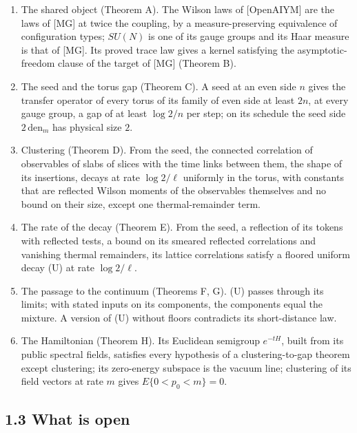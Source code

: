 \documentclass[10pt,letterpaper,twocolumn]{article}
\providecommand{\tightlist}{\setlength{\itemsep}{0pt}\setlength{\parskip}{0pt}}
\begin{document}
\begin{enumerate}
\def\labelenumi{\arabic{enumi}.}
\tightlist
\item
  The shared object (Theorem A). The Wilson laws of {[}OpenAIYM{]} are the laws of {[}MG{]} at twice the coupling, by a measure-preserving equivalence of configuration types; \(SU(N)\) is one of its gauge groups and its Haar measure is that of {[}MG{]}. Its proved trace law gives a kernel satisfying the asymptotic-freedom clause of the target of {[}MG{]} (Theorem B).
\item
  The seed and the torus gap (Theorem C). A seed at an even side \(n\) gives the transfer operator of every torus of its family of even side at least \(2n\), at every gauge group, a gap of at least \(\log2/n\) per step; on its schedule the seed side \(2\,\mathrm{den}_m\) has physical size \(2\).
\item
  Clustering (Theorem D). From the seed, the connected correlation of observables of slabs of slices with the time links between them, the shape of its insertions, decays at rate \(\log2/\ell\) uniformly in the torus, with constants that are reflected Wilson moments of the observables themselves and no bound on their size, except one thermal-remainder term.
\item
  The rate of the decay (Theorem E). From the seed, a reflection of its tokens with reflected tests, a bound on its smeared reflected correlations and vanishing thermal remainders, its lattice correlations satisfy a floored uniform decay (U) at rate \(\log2/\ell\).
\item
  The passage to the continuum (Theorems F, G). (U) passes through its limits; with stated inputs on its components, the components equal the mixture. A version of (U) without floors contradicts its short-distance law.
\item
  The Hamiltonian (Theorem H). Its Euclidean semigroup \(e^{-tH}\), built from its public spectral fields, satisfies every hypothesis of a clustering-to-gap theorem except clustering; its zero-energy subspace is the vacuum line; clustering of its field vectors at rate \(m\) gives \(E\{0<p_0<m\}=0\).
\end{enumerate}

\subsection{1.3 What is open}\label{13-what-is-open}
\end{document}
